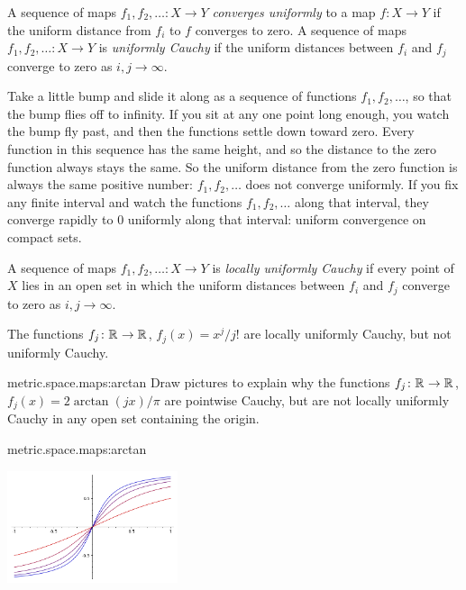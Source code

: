 A sequence of maps \(f_1, f_2, \dots \colon X \to Y\) \emph{converges uniformly} to a map \(f \colon X \to Y\) if the uniform distance from \(f_i\) to \(f\) converges to zero.
A sequence of maps \(f_1, f_2, \dots \colon X \to Y\) is \emph{uniformly Cauchy} if the uniform distances between \(f_i\) and \(f_j\) converge to zero as \(i, j \to \infty\).
\begin{example}
Take a little bump
and slide it along
as a sequence of functions \(f_1, f_2, \dots\), so that the bump flies off to infinity.
If you sit at any one point long enough, you watch the bump fly past, and then the functions settle down toward zero.
Every function in this sequence has the same height, and so the distance to the zero function always stays the same.
So the uniform distance from the zero function is always the same positive number: \(f_1, f_2, \dots\) does not converge uniformly.
If you fix any finite interval and watch the functions \(f_1, f_2, \dots\) along that interval, they converge rapidly to \(0\) uniformly along that interval: uniform convergence on compact sets.
\end{example}
A sequence of maps \(f_1, f_2, \dots \colon X \to Y\) is \emph{locally uniformly Cauchy} if every point of \(X\) lies in an open set in which the uniform distances between \(f_i\) and \(f_j\) converge to zero as \(i, j \to \infty\).
\begin{example}
The functions \(f_j \colon \mathbb{R}^{} \to \mathbb{R}^{}\), \(f_j(x)=x^j/j!\) are locally uniformly Cauchy, but not uniformly Cauchy.
\end{example}
\begin{problem}{metric.space.maps:arctan}
Draw pictures to explain why the functions \(f_j \colon \mathbb{R}^{} \to \mathbb{R}^{}\), \(f_j(x)=2\arctan(jx)/\pi\) are pointwise Cauchy, but are not locally uniformly Cauchy in any open set containing the origin.
\end{problem}
\begin{answer}{metric.space.maps:arctan}
\begin{center}
\includegraphics[width=5cm]{arctan-plots}
\end{center}
\end{answer}
